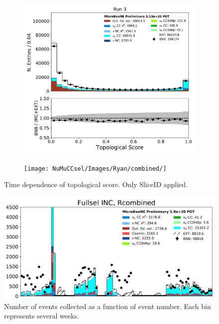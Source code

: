 \begin{figure}[hbt!]
\begin{center}
\begin{subfigure}[b]{0.35\textwidth}
    \end{subfigure}
    \begin{subfigure}[b]{0.35\textwidth}
        \centering
        \includegraphics[width=1.00\textwidth]{NuMuCCsel/Images/Ryan/Run3_nocrt/topological_score_08062020_samples_longest_noCRT_event_category.pdf}
    \end{subfigure} %
    \begin{subfigure}[b]{0.35\textwidth}
        \centering
        \texttt{[image: NuMuCCsel/Images/Ryan/combined/]}
    \end{subfigure}
\caption{Time dependence of topological score. Only SliceID applied.}
\label{fig:NuMuCCsel:timedep:topo}
\end{center}
\end{figure}

\begin{figure}[hbt!]
    \centering
    \includegraphics[width=0.5\linewidth]{NuMuCCsel/Images/Ryan/other/RUN_SPECTRUM.PNG}
    \caption{Number of events collected as a function of event number. Each bin represents several weeks.}
    \label{fig:NuMuCCsel:timedep:RunsDistribution}
\end{figure}
